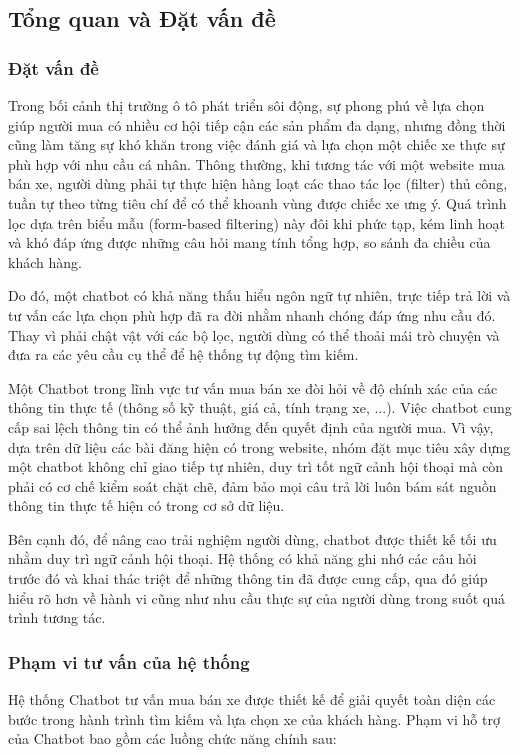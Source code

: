 \subsection{Tổng quan và Đặt vấn đề}

\subsubsection{Đặt vấn đề}

Trong bối cảnh thị trường ô tô phát triển sôi động, sự phong phú về lựa chọn giúp người mua có nhiều cơ hội tiếp cận các sản phẩm đa dạng, nhưng đồng thời cũng làm tăng sự khó khăn trong việc đánh giá và lựa chọn một chiếc xe thực sự phù hợp với nhu cầu cá nhân. Thông thường, khi tương tác với một website mua bán xe, người dùng phải tự thực hiện hàng loạt các thao tác lọc (filter) thủ công, tuần tự theo từng tiêu chí để có thể khoanh vùng được chiếc xe ưng ý. Quá trình lọc dựa trên biểu mẫu (form-based filtering) này đôi khi phức tạp, kém linh hoạt và khó đáp ứng được những câu hỏi mang tính tổng hợp, so sánh đa chiều của khách hàng.

Do đó, một chatbot có khả năng thấu hiểu ngôn ngữ tự nhiên, trực tiếp trả lời và tư vấn các lựa chọn phù hợp đã ra đời nhằm nhanh chóng đáp ứng nhu cầu đó. Thay vì phải chật vật với các bộ lọc, người dùng có thể thoải mái trò chuyện và đưa ra các yêu cầu cụ thể để hệ thống tự động tìm kiếm.

Một Chatbot trong lĩnh vực tư vấn mua bán xe đòi hỏi về độ chính xác của các thông tin thực tế (thông số kỹ thuật, giá cả, tính trạng xe, ...). Việc chatbot cung cấp sai lệch thông tin có thể ảnh hưởng đến quyết định của người mua. Vì vậy, dựa trên dữ liệu các bài đăng hiện có trong website, nhóm đặt mục tiêu xây dựng một chatbot không chỉ giao tiếp tự nhiên, duy trì tốt ngữ cảnh hội thoại mà còn phải có cơ chế kiểm soát chặt chẽ, đảm bảo mọi câu trả lời luôn bám sát nguồn thông tin thực tế hiện có trong cơ sở dữ liệu.

Bên cạnh đó, để nâng cao trải nghiệm người dùng, chatbot được thiết kế tối ưu nhằm duy trì ngữ cảnh hội thoại. Hệ thống có khả năng ghi nhớ các câu hỏi trước đó và khai thác triệt để những thông tin đã được cung cấp, qua đó giúp hiểu rõ hơn về hành vi cũng như nhu cầu thực sự của người dùng trong suốt quá trình tương tác.

\subsubsection{Phạm vi tư vấn của hệ thống}
Hệ thống Chatbot tư vấn mua bán xe được thiết kế để giải quyết toàn diện các bước trong hành trình tìm kiếm và lựa chọn xe của khách hàng. Phạm vi hỗ trợ của Chatbot bao gồm các luồng chức năng chính sau:

